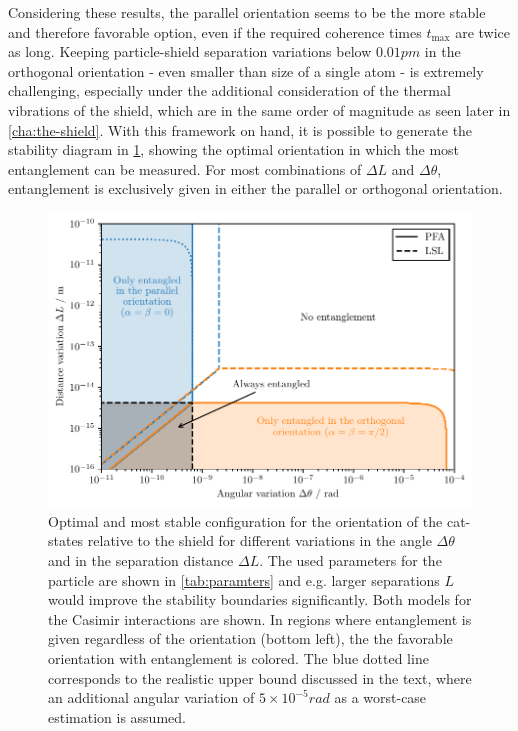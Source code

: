 Considering these results, the parallel orientation seems to be the more stable and therefore favorable option, even if the required coherence times $t_\mathrm{max}$ are twice as long.
Keeping particle-shield separation variations below $0.01\si{pm}$ in the orthogonal orientation - even smaller than size of a single atom - is extremely challenging,  
especially under the additional consideration of the thermal vibrations of the shield, which are in the same order of magnitude as seen later in \cref{cha:the-shield}.
With this framework on hand, it is possible to generate the stability diagram in \cref{fig:4:optimal-orientation}, showing the optimal orientation in which the most entanglement can be measured.
For most combinations of $\Delta L$ and $\Delta \theta$, entanglement is exclusively given in either the parallel or orthogonal orientation.
\begin{figure}[!htbp]
  \centering
  \includegraphics[width=\textwidth]{./../figures/optimize/optimized-orientation-advanced.pdf}
  \caption{Optimal and most stable configuration for the orientation of the cat-states relative to the shield for different variations in the angle $\Delta \theta$ and in the separation distance $\Delta L$. The used parameters for the particle are shown in \cref{tab:paramters} and e.g. larger separations $L$ would improve the stability boundaries significantly. Both models for the Casimir interactions are shown. In regions where entanglement is given regardless of the orientation (bottom left), the the favorable orientation with  entanglement is colored. The blue dotted line corresponds to the realistic upper bound discussed in the text, where an additional angular variation of $5 \times 10^{-5}\si{rad}$ as a worst-case estimation is assumed.}
  \label{fig:4:optimal-orientation}
\end{figure}


